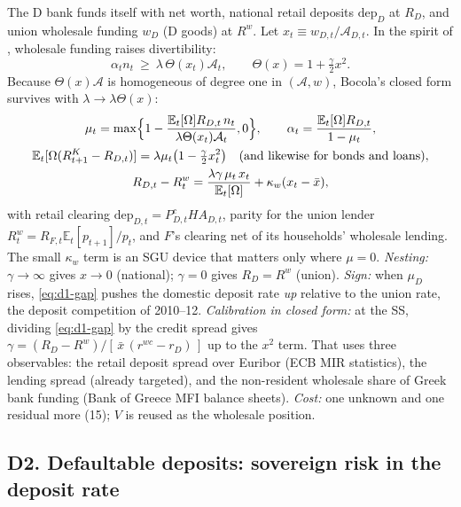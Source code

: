\documentclass[11pt]{article}
\newcommand{\E}{\mathbb{E}}
\newcommand{\A}{\mathcal{A}}
\begin{document}
The D bank funds itself with net worth, national retail deposits $\mathrm{dep}_D$ at $R_D$, and
union wholesale funding $w_D$ (D goods) at $R^w$. Let $x_t\equiv w_{D,t}/\A_{D,t}$. In the spirit
of \citet{aoki2016monetary}, wholesale funding raises divertibility:
\begin{equation}
\alpha_t n_t\ \ge\ \lambda\,\Theta(x_t)\A_t,\qquad \Theta(x)=1+\tfrac{\gamma}{2}x^2 .
\end{equation}
Because $\Theta(x)\A$ is homogeneous of degree one in $(\A,w)$, Bocola's closed form survives
with $\lambda\to\lambda\Theta(x)$:
\begin{gather}
\mu_t=\max\Bigl\{1-\frac{\E_t[\Omega]R_{D,t}\,n_t}{\lambda\Theta(x_t)\A_t},0\Bigr\},\qquad
\alpha_t=\frac{\E_t[\Omega]R_{D,t}}{1-\mu_t},\\
\E_t[\Omega(R^K_{t+1}-R_{D,t})]=\lambda\mu_t\bigl(1-\tfrac{\gamma}{2}x_t^2\bigr)
\quad\text{(and likewise for bonds and loans)},\\
R_{D,t}-R^w_t=\frac{\lambda\gamma\,\mu_t\,x_t}{\E_t[\Omega]}+\kappa_w(x_t-\bar x),
\label{eq:d1-gap}
\end{gather}
with retail clearing $\mathrm{dep}_{D,t}=P^c_{D,t}HA_{D,t}$, parity for the union lender
$R^w_t=R_{F,t}\E_t[p_{t+1}]/p_t$, and $F$'s clearing net of its households' wholesale lending.
The small $\kappa_w$ term is an SGU device that matters only where $\mu=0$.
\emph{Nesting:} $\gamma\to\infty$ gives $x\to0$ (national); $\gamma=0$ gives $R_D=R^w$ (union).
\emph{Sign:} when $\mu_D$ rises, \eqref{eq:d1-gap} pushes the domestic deposit rate \emph{up}
relative to the union rate, the deposit competition of 2010--12.
\emph{Calibration in closed form:} at the SS, dividing \eqref{eq:d1-gap} by the credit spread
gives $\gamma=(R_D-R^w)/[\,\bar x\,(r^{wc}-r_D)\,]$ up to the $x^2$ term. That uses three
observables: the retail deposit spread over Euribor (ECB MIR statistics), the lending spread
(already targeted), and the non-resident wholesale share of Greek bank funding (Bank of Greece
MFI balance sheets).
\emph{Cost:} one unknown and one residual more (15); $V$ is reused as the wholesale position.

\subsection*{D2. Defaultable deposits: sovereign risk in the deposit rate}
\end{document}
